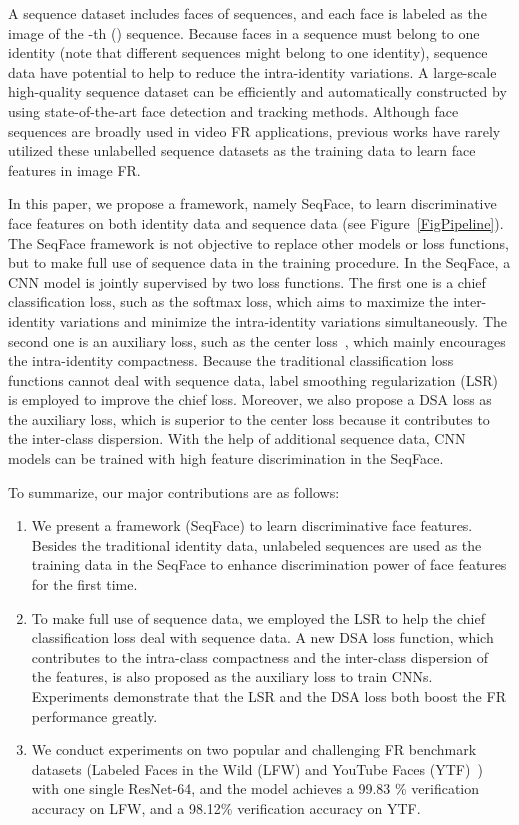 \documentclass[conference]{acmsiggraph}
\begin{document}
A sequence dataset includes  faces of  sequences, and each face is labeled as the image of the -th () sequence. Because faces in a sequence must belong to one identity (note that different sequences might belong to one identity), sequence data have potential to help to reduce the intra-identity variations. A large-scale high-quality sequence dataset can be efficiently and automatically constructed by using state-of-the-art face detection and tracking methods. Although face sequences are broadly used in video FR applications, previous works have rarely utilized these unlabelled sequence datasets as the training data to learn face features in image FR.

In this paper, we propose a framework, namely SeqFace, to learn discriminative face features on both identity data and sequence data (see Figure~\ref{FigPipeline}). The SeqFace framework is not objective to replace other models or loss functions, but to make full use of sequence data in the training procedure. In the SeqFace, a CNN model is jointly supervised by two loss functions. The first one is a chief classification loss, such as the softmax loss, which aims to maximize the inter-identity variations and minimize the intra-identity variations simultaneously. The second one is an auxiliary loss, such as the center loss~\cite{centerloss}, which mainly encourages the intra-identity compactness. Because the traditional classification loss functions cannot deal with sequence data, label smoothing regularization (LSR) is employed to improve the chief loss. Moreover, we also propose a DSA loss as the auxiliary loss, which is superior to the center loss because it contributes to the inter-class dispersion. With the help of additional sequence data, CNN models can be trained with high feature discrimination in the SeqFace.

To summarize, our major contributions are as follows:

\begin{enumerate}
\item We present a framework (SeqFace) to learn discriminative face features. Besides the traditional identity data, unlabeled sequences are used as the training data in the SeqFace to enhance discrimination power of face features for the first time. 
\item To make full use of sequence data, we employed the LSR to help the chief classification loss deal with sequence data. A new DSA loss function, which contributes to the intra-class compactness and the inter-class dispersion of the features, is also proposed as the auxiliary loss to train CNNs. Experiments demonstrate that the LSR and the DSA loss both boost the FR performance greatly.
\item We conduct experiments on two popular and challenging FR benchmark datasets (Labeled Faces in the Wild (LFW) and YouTube Faces (YTF)~\cite{ytf}) with one single ResNet-64, and the model achieves a 99.83 \% verification accuracy on LFW, and a 98.12\% verification accuracy on YTF.
\end{enumerate}
\end{document}
